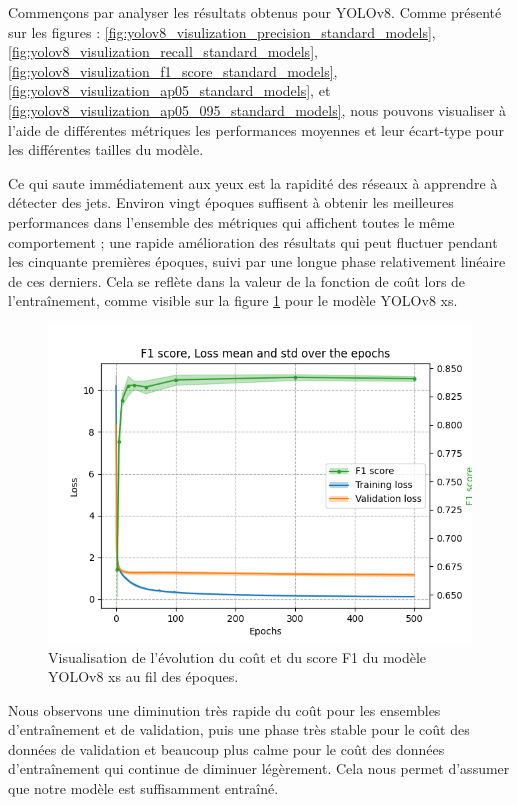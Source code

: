 Commençons par analyser les résultats obtenus pour YOLOv8. Comme présenté sur les figures : \ref{fig:yolov8_visulization_precision_standard_models}, \ref{fig:yolov8_visulization_recall_standard_models}, \ref{fig:yolov8_visulization_f1_score_standard_models}, \ref{fig:yolov8_visulization_ap05_standard_models}, et \ref{fig:yolov8_visulization_ap05_095_standard_models}, nous pouvons visualiser à l'aide de différentes métriques les performances moyennes et leur écart-type pour les différentes tailles du modèle.

Ce qui saute immédiatement aux yeux est la rapidité des réseaux à apprendre à détecter des jets. Environ vingt époques suffisent à obtenir les meilleures performances dans l'ensemble des métriques qui affichent toutes le même comportement ; une rapide amélioration des résultats qui peut fluctuer pendant les cinquante premières époques, suivi par une longue phase relativement linéaire de ces derniers. Cela se reflète dans la valeur de la fonction de coût lors de l'entraînement, comme visible sur la figure \ref{fig:yolov8_xs_f1_score_and_loss} pour le modèle YOLOv8 xs.

\begin{figure}[hbt!]
    \centering
    \includegraphics[scale=0.7]{Figures/results/yolov8/yolov8_xs_f1_score_and_loss.png}
    \caption{Visualisation de l'évolution du coût et du score F1 du modèle YOLOv8 xs au fil des époques.}
    \label{fig:yolov8_xs_f1_score_and_loss}
\end{figure}

\newpage

Nous observons une diminution très rapide du coût pour les ensembles d'entraînement et de validation, puis une phase très stable pour le coût des données de validation et beaucoup plus calme pour le coût des données d'entraînement qui continue de diminuer légèrement. Cela nous permet d'assumer que notre modèle est suffisamment entraîné.\\


